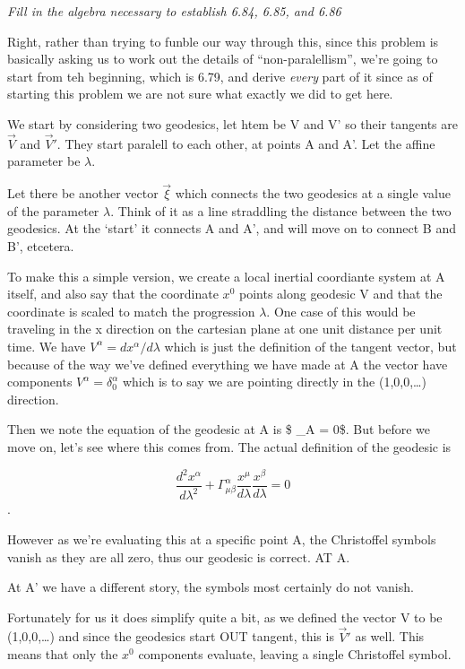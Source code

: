\documentclass[landscape,letterpaper,10pt,english]{article}
\begin{document}
\[\label{P22}\]

\emph{Fill in the algebra necessary to establish 6.84, 6.85, and 6.86}

    Right, rather than trying to funble our way through this, since this
problem is basically asking us to work out the details of
``non-paralellism'', we're going to start from teh beginning, which is
6.79, and derive \emph{every} part of it since as of starting this
problem we are not sure what exactly we did to get here.

We start by considering two geodesics, let htem be V and V' so their
tangents are \(\vec V\) and \(\vec V'\). They start paralell to each
other, at points A and A'. Let the affine parameter be \(\lambda\).

Let there be another vector \(\vec\xi\) which connects the two geodesics
at a single value of the parameter \(\lambda\). Think of it as a line
straddling the distance between the two geodesics. At the `start' it
connects A and A', and will move on to connect B and B', etcetera.

To make this a simple version, we create a local inertial coordiante
system at A itself, and also say that the coordinate \(x^0\) points
along geodesic V and that the coordinate is scaled to match the
progression \(\lambda\). One case of this would be traveling in the x
direction on the cartesian plane at one unit distance per unit time. We
have \(V^\alpha = dx^\alpha / d\lambda\) which is just the definition of
the tangent vector, but because of the way we've defined everything we
have made at A the vector have components \(V^\alpha = \delta^\alpha_0\)
which is to say we are pointing directly in the (1,0,0,\ldots)
direction.

Then we note the equation of the geodesic at A is \$
 \textbar\_A = 0\$. But before we move on,
let's see where this comes from. The actual definition of the geodesic
is

\[ \frac{d^2 x^\alpha}{d\lambda^2} + \Gamma^\alpha_{\mu\beta} \frac{x^\mu}{d\lambda} \frac{x^\beta}{d\lambda} = 0 \].

However as we're evaluating this at a specific point A, the Christoffel
symbols vanish as they are all zero, thus our geodesic is correct. AT A.

At A' we have a different story, the symbols most certainly do not
vanish.

    Fortunately for us it does simplify quite a bit, as we defined the
vector V to be (1,0,0,\ldots) and since the geodesics start OUT tangent,
this is \(\vec V'\) as well. This means that only the \(x^0\) components
evaluate, leaving a single Christoffel symbol.
\end{document}
